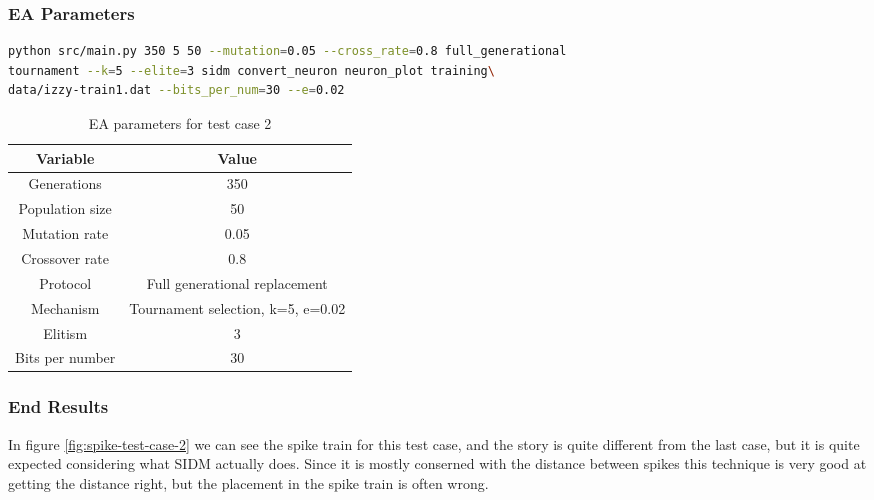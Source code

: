 \subsubsection{EA Parameters}\label{sec:test-case-2-parameters}
\begin{lstlisting}[frame=single, language=bash, caption=Command-line to
replicate the results]
python src/main.py 350 5 50 --mutation=0.05 --cross_rate=0.8 full_generational
tournament --k=5 --elite=3 sidm convert_neuron neuron_plot training\
data/izzy-train1.dat --bits_per_num=30 --e=0.02
\end{lstlisting}
\begin{table}
	\begin{tabular}{c c}
		Variable & Value \\
		\hline
		Generations & 350 \\
		\hline
		Population size & 50 \\
		\hline
		Mutation rate & 0.05 \\
		\hline
		Crossover rate & 0.8 \\
		\hline
		Protocol & Full generational replacement \\
		\hline
		Mechanism & Tournament selection, k=5, e=0.02 \\
		\hline
		Elitism & 3 \\
		\hline
		Bits per number & 30 \\
	\end{tabular}
	\caption{EA parameters for test case 2}
\end{table}
\subsubsection{End Results}\label{sec:test-case-2-results}
In figure \ref{fig:spike-test-case-2} we can see the spike train for this test
case, and the story is quite different from the last case, but it is quite
expected considering what SIDM actually does. Since it is mostly conserned with
the distance between spikes this technique is very good at getting the distance
right, but the placement in the spike train is often wrong.

